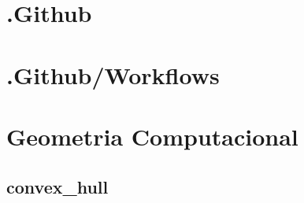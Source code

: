 \section*{.Github}

\section*{.Github/Workflows}

\section*{Geometria Computacional}

\subsection*{convex_hull}
